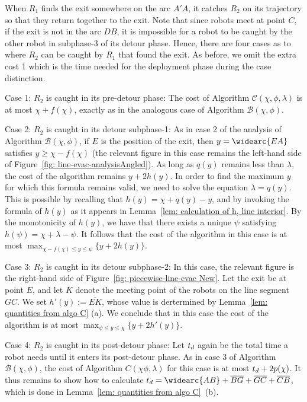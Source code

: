 \documentclass[
final
]{dmtcs-episciences}
\newcommand{\barr}[1]{\overline{#1}}
\newcommand{\RA}{\ensuremath{R_1}}
\newcommand{\RB}{\ensuremath{R_2 }}
\newcommand{\arccc}[1]{
\widearc{#1}
}
\theoremstyle{definition}
\begin{document}
When $\RA$ finds the exit somewhere on the arc $A'A$,
it catches $\RB$ on its trajectory so that they return together to the exit. Note that since robots meet at point $C$, if the exit is not in the arc $DB$, it is impossible for a robot to be caught by the other robot in subphase-3 of its detour phase. Hence, there are four cases as to where $\RB$ can be caught by $\RA$ that found the exit. 
As before, we omit the extra cost 1 which is the time needed for the deployment phase during the case distinction.\\


\begin{description}
\item{Case 1: $\RB$ is caught in its pre-detour phase:} The cost of Algorithm $\mathcal C(\chi, \phi, \lambda)$ is at most $\chi+f(\chi)$, exactly as in the analogous case of Algorithm $\mathcal B(\chi, \phi)$. 

\item{Case 2:  $\RB$ is caught in its detour subphase-1:} As in case 2 of the analysis of Algorithm $\mathcal B(\chi, \phi)$, if $E$ is the position of the exit, then $y=\arccc{EA}$ satisfies $y\geq \chi-f(\chi)$ (the relevant figure in this case remains the left-hand side of Figure~\ref{fig: line-evac-analysisAngled}). As long as $q(y)$ remains less than $\lambda$, the cost of the algorithm remains $y+2h(y)$. In order to find the maximum $y$ for which this formula remains valid, we need to solve the equation $\lambda=q(y)$. This is possible by recalling that  $h(y)=\chi+q(y)-y$, and by invoking the formula of $h(y)$ as it appears in Lemma~\ref{lem: calculation of h, line interior}. By the monotonicity of $h(y)$, we have that there exists a unique $\psi$ satisfying $h(\psi) = \chi+\lambda - \psi$. It follows that the cost of the algorithm in this case is at most
$\max_{\chi-f(\chi) \leq y \leq \psi} \{ y + 2h(y)\}$.

\item{Case 3: $\RB$ is caught in its detour subphase-2:} In this case, the relevant figure is the right-hand side of Figure~\ref{fig: piecewise-line-evac New}. Let the exit be at point $E$, and let $K$ denote the meeting point of the robots on the line segment $GC$. We set $h'(y):=\barr{EK}$, 
whose value is dertermined by 	
Lemma~\ref{lem: quantities from algo C} (a).  We conclude that in this case the cost of the algorithm is at most $\max_{\psi \leq y \leq \chi} \{ y + 2h'(y)\}$.

\item{Case 4:  $\RB$ is caught in its post-detour phase:} Let $t_d$ again be the total time a robot needs until it enters its post-detour phase. As in case 3 of Algorithm $\mathcal B(\chi, \phi)$, the cost of Algorithm $C(\chi \phi, \lambda)$ for this case is at most $t_d+2p(\chi)$. It thus remains to show how to calculate $\postC = \arccc{AB}+\barr{BG}+\barr{GC}+\barr{CB}$, which is done in Lemma~\ref{lem: quantities from algo C}~(b). 
\end{description}
\end{document}
